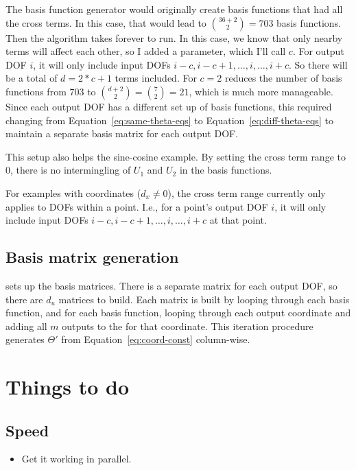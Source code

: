 \documentclass{article}
\def\lstinline#1{}%
\begin{document}
The basis function generator would originally create basis functions that had
all the cross terms. In this case, that would lead to $\binom{36 + 2}{2} = 703$
basis functions. Then the algorithm takes forever to run. In this case, we know
that only nearby terms will affect each other, so I added a
\lstinline{cross_term_range} parameter, which I'll call $c$. For output DOF $i$,
it will only include input DOFs $i-c,i-c+1,\hdots,i,\hdots,i+c$. So there will
be a total of $d = 2*c+1$ terms included. For $c=2$ reduces the number of basis
functions from 703 to $\binom{d+2}{2} = \binom{7}{2} = 21$, which is much more
manageable. Since each output DOF has a different set up of basis functions,
this required changing from Equation~\ref{eq:same-theta-eqs} to
Equation~\ref{eq:diff-theta-eqs} to maintain a separate basis matrix for each
output DOF.

This setup also helps the sine-cosine example. By setting the cross term range
to 0, there is no intermingling of $U_1$ and $U_2$ in the basis functions.

For examples with coordinates ($d_x \ne 0$), the cross term range currently only
applies to DOFs within a point. I.e., for a point's output DOF $i$, it will only
include input DOFs $i-c,i-c+1,\hdots,i,\hdots,i+c$ at that point.

\subsection{Basis matrix generation}

\lstinline{SINDyBasisAddVariables} sets up the basis matrices. There is a
separate matrix for each output DOF, so there are $d_u$ matrices to build.
Each matrix is built by looping through each basis function, and for each basis function,
looping through each output coordinate and adding all $m$ outputs to the for that coordinate.
This iteration procedure generates $\Theta'$ from Equation~\ref{eq:coord-const} column-wise.

\section{Things to do}

\subsection{Speed}
\begin{itemize}
    \item Get it working in parallel.
\end{itemize}
\end{document}

